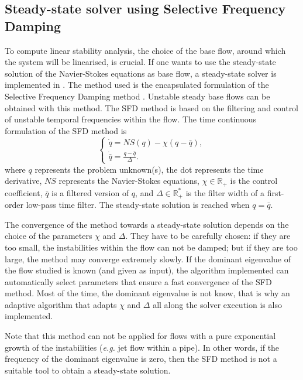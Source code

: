 \subsection{Steady-state solver using Selective Frequency Damping}
\label{SectionSFD}

To compute linear stability analysis, the choice of the base flow,
around which the system will be linearised, is crucial. If one wants
to use the steady-state solution of the Navier-Stokes equations as
base flow, a steady-state solver is implemented in \nekpp. The method
used is the encapsulated formulation of the Selective Frequency
Damping method \cite{JoCoSh14}. Unstable steady base flows can be
obtained with this method. The SFD method is based on the filtering
and control of unstable temporal frequencies within the flow. The time
continuous formulation of the SFD method is
\begin{equation}
\begin{cases}
\dot{q}=NS(q)-\chi (q-\bar{q}), \\
\dot{\bar{q}}=\frac{q-\bar{q}}{\Delta}.
\end{cases}
\label{SFD-General}
\end{equation}
where $q$ represents the problem unknown(s), the dot represents the time derivative, $NS$ represents the Navier-Stokes equations, $\chi \in \mathbb{R}_+$ is the control coefficient, $\bar{q}$ is a filtered version of $q$, and $\Delta \in \mathbb{R}_+ ^*$ is the filter width of a first-order low-pass time filter. The steady-state solution is reached when $q=\bar{q}$.

The convergence of the method towards a steady-state solution depends on the choice of the parameters $\chi$ and $\Delta$. They have to be carefully chosen: if they are too small, the instabilities within the flow can not be damped; but if they are too large, the method may converge extremely slowly. If the dominant eigenvalue of the flow studied is known (and given as input), the algorithm implemented can automatically select parameters that ensure a fast convergence of the SFD method. Most of the time, the dominant eigenvalue is not know, that is why an adaptive algorithm that adapts $\chi$ and $\Delta$ all along the solver execution is also implemented.

Note that this method can not be applied for flows with a pure exponential growth of the instabilities (\textit{e.g.} jet flow within a pipe). In other words, if the frequency of the dominant eigenvalue is zero, then the SFD method is not a suitable tool to obtain a steady-state solution.



